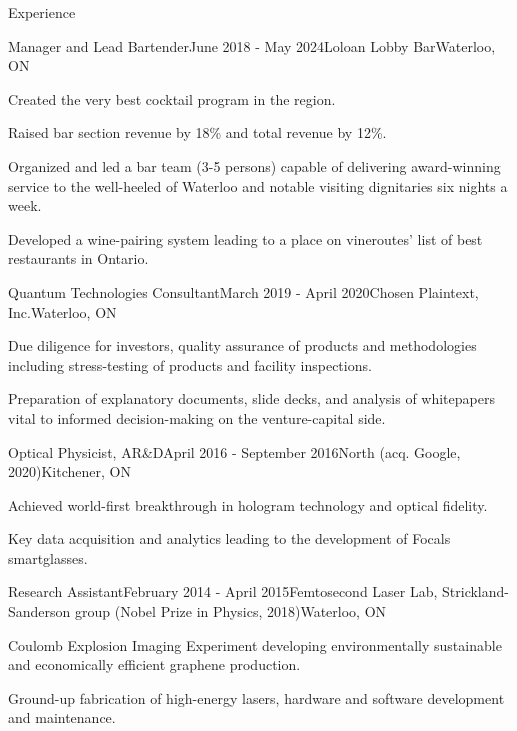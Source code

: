 \documentclass{resume}
\begin{document}

\begin{rSection}{Experience}
    \begin{rSubsection}{Manager and Lead Bartender}{June 2018 - May 2024}{Loloan Lobby Bar}{Waterloo, ON}
        \item Created the very best cocktail program in the region.
        \item Raised bar section revenue by 18\% and total revenue by 12\%.
        \item Organized and led a bar team (3-5 persons) capable of delivering award-winning service to the well-heeled of Waterloo and notable visiting dignitaries six nights a week.
        \item Developed a wine-pairing system leading to a place on vineroutes' list of best restaurants in Ontario.
    \end{rSubsection}

    \begin{rSubsection}{Quantum Technologies Consultant}{March 2019 - April 2020}{Chosen Plaintext, Inc.}{Waterloo, ON}
    \item Due diligence for investors, quality assurance of products and methodologies including stress-testing of products and facility inspections.
    \item Preparation of explanatory documents, slide decks, and analysis of whitepapers vital to informed decision-making on the venture-capital side.
    \end{rSubsection}

    \begin{rSubsection}{Optical Physicist, AR\&D}{April 2016 - September 2016}{North (acq. Google, 2020)}{Kitchener, ON}
        \item Achieved world-first breakthrough in hologram technology and optical fidelity.
        \item Key data acquisition and analytics leading to the development of Focals smartglasses.
    \end{rSubsection}

    \begin{rSubsection}{Research Assistant}{February 2014 - April 2015}{Femtosecond Laser Lab, Strickland-Sanderson group (Nobel Prize in Physics, 2018)}{Waterloo, ON}
        \item Coulomb Explosion Imaging Experiment developing environmentally sustainable and economically efficient graphene production.
        \item Ground-up fabrication of high-energy lasers, hardware and software development and maintenance. 
    \end{rSubsection}

\end{rSection}
\end{document}
